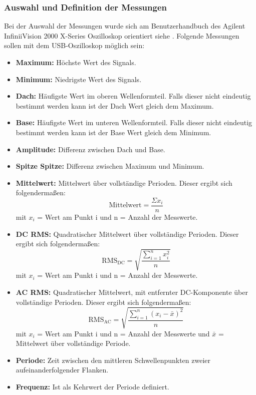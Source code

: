 \documentclass[a4paper, portrait, 12pt]{scrartcl} %
\begin{document}
\pagebreak

\subsubsection{Auswahl und Definition der Messungen}
Bei der Auswahl der Messungen wurde sich am Benutzerhandbuch des Agilent InfiniiVision 2000 X-Series Oszilloskop orientiert siehe \cite[ab S. 191]{Keysight2025}. Folgende Messungen sollen mit dem USB-Oszilloskop möglich sein:

\begin{itemize}
	\item \textbf{Maximum:} Höchste Wert des Signals.
	\item \textbf{Minimum:} Niedrigste Wert des Signals.
	\item \textbf{Dach:} Häufigste Wert im oberen Wellenformteil. Falls dieser nicht eindeutig bestimmt werden kann ist der Dach Wert gleich dem Maximum.
	\item \textbf{Base:} Häufigste Wert im unteren Wellenformteil. Falls dieser nicht eindeutig bestimmt werden kann ist der Base Wert gleich dem Minimum.
	\item \textbf{Amplitude:} Differenz zwischen Dach und Base.
	\item \textbf{Spitze Spitze:} Differenz zwischen Maximum und Minimum.
	\item \textbf{Mittelwert:} Mittelwert über vollständige Perioden. Dieser ergibt sich folgendermaßen:
	$$ \mathrm{Mittelwert} = \frac{\Sigma x_i}{n} $$ 
	{\footnotesize mit $x_i$ = Wert am Punkt i und n = Anzahl der Messwerte.}
	\item \textbf{DC RMS:} Quadratischer Mittelwert über vollständige Perioden. Dieser ergibt sich folgendermaßen:
	$$ 
	\mathrm{RMS_{DC}} = \sqrt{\frac{\sum_{i=1}^{n} x_i^2}{n}} 
	$$
	{\footnotesize mit $x_i$ = Wert am Punkt i und n = Anzahl der Messwerte.}
	\item \textbf{AC RMS:} Quadratischer Mittelwert, mit entfernter DC-Komponente über vollständige Perioden. Dieser ergibt sich folgendermaßen:
	$$ 
	\mathrm{RMS_{AC}} = \sqrt{\frac{\sum_{i=1}^{n} (x_i-\bar{x})^2}{n}} 
	$$
	{\footnotesize mit $x_i$ = Wert am Punkt i und n = Anzahl der Messwerte und $\bar{x}$ = Mittelwert über vollständige Periode.}
	\item \textbf{Periode:} Zeit zwischen den mittleren Schwellenpunkten zweier aufeinanderfolgender Flanken.
	\item \textbf{Frequenz:} Ist als Kehrwert der Periode definiert.
\end{itemize}
\end{document}
